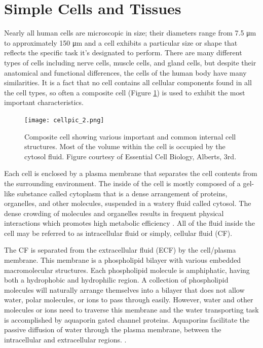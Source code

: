 \clearpage
\section{Simple Cells and Tissues}
\label{sec:intro-cells}
	Nearly all human cells are microscopic in size; their diameters range from 7.5 \si{\micro\meter} to approximately 150 \si{\micro\meter} and a cell exhibits a particular size or shape that reflects the specific task it's designated to perform. There are many different types of cells including nerve cells, muscle cells, and gland cells, but despite their anatomical and functional differences, the cells of the human body have many similarities. It is a fact that no cell contains all cellular components found in all the cell types, so often a composite cell (Figure {\ref{fig:cellpic_2.png}}) is used to exhibit the most important characteristics. 

	\begin{figure}[h]
		\centering
		\texttt{[image: cellpic\_2.png]}
		\caption[Simple composite cells]{Composite cell showing various important and common internal cell structures. Most of the volume within the cell is occupied by the cytosol fluid. Figure courtesy of Essential Cell Biology, Alberts, 3rd.}
		\label{fig:cellpic_2.png}
	\end{figure}

	Each cell is enclosed by a plasma membrane that separates the cell contents from the surrounding environment. The inside of the cell is mostly composed of a gel-like substance called cytoplasm that is a dense arrangement of proteins, organelles, and other molecules, suspended in a watery fluid called cytosol. The dense crowding of molecules and organelles results in frequent physical interactions which promotes high metabolic efficiency \citep{ap}. All of the fluid inside the cell may be referred to as intracellular fluid or simply, cellular fluid (CF).
	
	The CF is separated from the extracellular fluid (ECF) by the cell/plasma membrane. This membrane is a phospholipid bilayer with various embedded macromolecular structures. Each phospholipid molecule is amphiphatic, having both a hydrophobic and hydrophilic region. A collection of phospholipid molecules will naturally arrange themselves into a bilayer that does not allow water, polar molecules, or ions to pass through easily. However, water and other molecules or ions need to traverse this membrane and the water transporting task is accomplished by aquaporin gated channel proteins. Aquaporins facilitate the passive diffusion of water through the plasma membrane, between the intracellular and extracellular regions. \citep{ap}.
	
